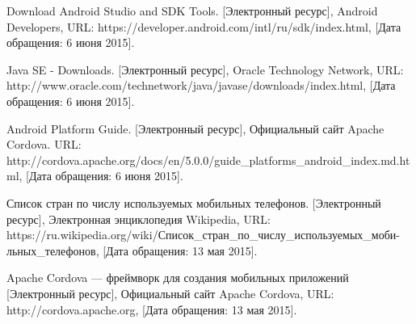 \begin{thebibliography}{30}
 Download Android Studio and SDK Tools. [Электронный ресурс], Android Developers, URL: https://developer.android.com/intl/ru/sdk/index.html, [Дата обращения: 6 июня 2015].

 Java SE - Downloads. [Электронный ресурс], Oracle Technology Network, URL: http://www.oracle.com/technetwork/java/javase/downloads/index.html, [Дата обращения: 6 июня 2015].

 Android Platform Guide. [Электронный ресурс],  Официальный сайт Apache Cordova. URL: http://cordova.apache.org/docs/en/5.0.0/guide\_platforms\_android\_index.md.html, [Дата обращения: 6 июня 2015].

 Список стран по числу используемых мобильных телефонов. [Электронный ресурс], Электронная энциклопедия Wikipedia, URL: https://ru.wikipedia.org/wiki/Список\_стран\_по\_числу\_используемых\_моби- льных\_телефонов, [Дата обращения: 13 мая 2015].

 Apache Cordova --- фреймворк для создания мобильных приложений [Электронный ресурс], Официальный сайт Apache Cordova, URL: http://cordova.apache.org, [Дата обращения: 13 мая 2015].


\end{thebibliography}
